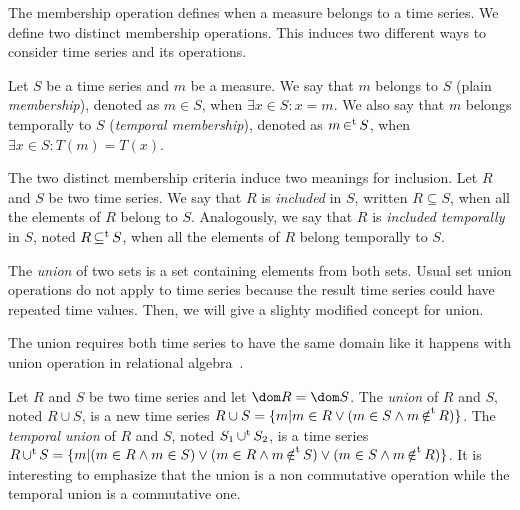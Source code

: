 The membership operation defines when a measure belongs to a time
series. We define two distinct membership operations. This induces two
different ways to consider time series and its operations.

Let $S$ be a time series and $m$ be a measure. 
%
We say that $m$ belongs to $S$ (plain \emph{membership}), denoted as
$m \in S$, when $\exists x\in S: x=m$.  We also say that $m$ belongs
temporally to $S$ (\emph{temporal membership}), denoted as $m \operatorname*{\in^t}
S$, when $\exists x\in S : T(m)=T(x)$.


The two distinct membership criteria induce two meanings for
inclusion. Let $R$ and $S$ be two time series.  We say that $R$ is
\emph{included} in $S$, written $R\subseteq S$, when all the elements
of $R$ belong to $S$.  Analogously, we say that $R$ is \emph{included
  temporally} in $S$, noted $R\operatorname*{\subseteq^t} S$, when all the elements of
$R$ belong temporally to $S$.


The \emph{union} of two sets is a set containing elements from both
sets. Usual set union operations do not apply to time series because
the result time series could have repeated time values.  Then, we will
give a slighty modified concept for union.

The union requires both time series to have the same domain like it
happens with union operation in relational
algebra~\cite{date:introduction}.

Let $R$ and $S$ be two time series and let $\dom R =\dom S$. 
%
The \emph{union} of $R$ and $S$, noted $R\cup S$, is a new time series
$R \cup S = \{m|m\in R\vee (m\in S\wedge m \operatorname*{\notin^t} R)\}$. 
%
The \emph{temporal union} of $R$ and $S$, noted $S_1 \operatorname*{\cup^t} S_2$, is a
time series $R \operatorname*{\cup^t} S = \{ m | (m \in R \wedge m \in S) \vee (m \in R
\wedge m \operatorname*{\notin^t} S) \vee (m \in S \wedge m \operatorname*{\notin^t} R) \}$.  
%
%
It is interesting to emphasize that the union is a non commutative
operation while the temporal union is a commutative one.

